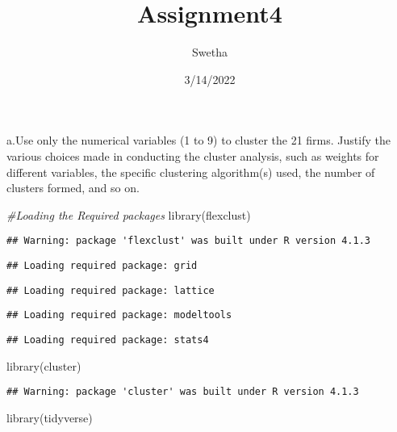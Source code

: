 \documentclass[
]{article}
\title{Assignment4}
\author{Swetha}
\date{3/14/2022}
\newenvironment{Shaded}{\begin{snugshade}}{\end{snugshade}}
\newcommand{\CommentTok}[1]{\textcolor[rgb]{0.56,0.35,0.01}{\textit{#1}}}
\newcommand{\FunctionTok}[1]{\textcolor[rgb]{0.00,0.00,0.00}{#1}}
\newcommand{\NormalTok}[1]{#1}
\begin{document}
\maketitle

a.Use only the numerical variables (1 to 9) to cluster the 21 firms.
Justify the various choices made in conducting the cluster analysis,
such as weights for different variables, the specific clustering
algorithm(s) used, the number of clusters formed, and so on.

\begin{Shaded}
\begin{Highlighting}[]
\CommentTok{\#Loading the Required packages}
\FunctionTok{library}\NormalTok{(flexclust)}
\end{Highlighting}
\end{Shaded}

\begin{verbatim}
## Warning: package 'flexclust' was built under R version 4.1.3
\end{verbatim}

\begin{verbatim}
## Loading required package: grid
\end{verbatim}

\begin{verbatim}
## Loading required package: lattice
\end{verbatim}

\begin{verbatim}
## Loading required package: modeltools
\end{verbatim}

\begin{verbatim}
## Loading required package: stats4
\end{verbatim}

\begin{Shaded}
\begin{Highlighting}[]
\FunctionTok{library}\NormalTok{(cluster)}
\end{Highlighting}
\end{Shaded}

\begin{verbatim}
## Warning: package 'cluster' was built under R version 4.1.3
\end{verbatim}

\begin{Shaded}
\begin{Highlighting}[]
\FunctionTok{library}\NormalTok{(tidyverse)  }
\end{Highlighting}
\end{Shaded}
\end{document}
